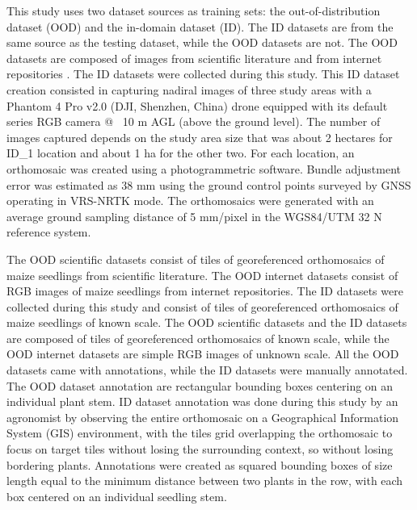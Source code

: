 \documentclass[12pt,a4paper,oneside]{report}
\begin{document}
This study uses two dataset sources as training sets: the out-of-distribution dataset (OOD)
and the in-domain dataset (ID). The ID datasets are from the same source as the
testing dataset, while the OOD datasets are not.
The OOD datasets are composed of images from scientific literature \cite{liuEstimatingMaizeSeedling2022,davidPlantDetectionCounting2021}
and from internet repositories \cite{Maize_seedingDatasetOverview,MaizeseedlingdetectionDatasetOverview}.
The ID datasets were collected during this study. This ID dataset creation consisted in
capturing nadiral images of three study areas with a Phantom 4 Pro v2.0 (DJI, Shenzhen, China)
drone equipped with its default series RGB camera @ ~10 m AGL (above the ground level).
The number of images captured depends on the study area size that was about 2 hectares
for ID\_1 location and about 1 ha for the other two.
For each location, an orthomosaic was created using a photogrammetric software.
Bundle adjustment error was estimated as 38 mm using the ground control points
surveyed by GNSS operating in VRS-NRTK mode. The orthomosaics were generated with an 
average ground sampling distance of 5 mm/pixel in the WGS84/UTM 32 N reference system.

The OOD scientific datasets consist of tiles of georeferenced orthomosaics of maize seedlings from scientific literature.
The OOD internet datasets consist of RGB images of maize seedlings from internet repositories.
The ID datasets were collected during this study and consist of tiles of georeferenced orthomosaics of maize seedlings of known scale.
The OOD scientific datasets and the ID datasets are composed of tiles of georeferenced orthomosaics 
of known scale, while the OOD internet datasets are simple RGB images of unknown scale.
All the OOD datasets came with annotations, while the ID datasets were manually annotated.
The OOD dataset annotation are rectangular bounding boxes centering on an individual plant stem.
ID dataset annotation was done during this study by an agronomist by observing the 
entire orthomosaic on a Geographical Information System (GIS) environment, 
with the tiles grid
overlapping the orthomosaic to focus on target tiles without losing the surrounding
context, so without losing bordering plants. Annotations were created as squared 
bounding boxes of size length equal to the minimum distance between two plants in the row, 
with each box centered on an individual seedling stem. 
\end{document}
